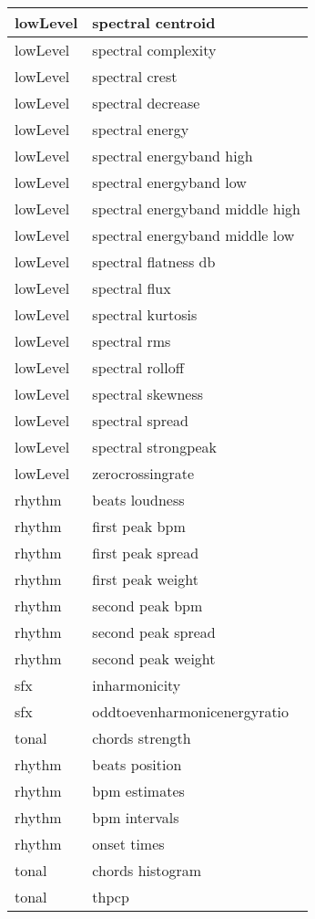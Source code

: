 \begin{center}
\begin{longtable}{| p{} | p{} |}
lowLevel & spectral centroid \\ \hline
lowLevel & spectral complexity \\ \hline
lowLevel & spectral crest \\ \hline
lowLevel & spectral decrease \\ \hline
lowLevel & spectral energy \\ \hline
lowLevel & spectral energyband high \\ \hline
lowLevel & spectral energyband low \\ \hline
lowLevel & spectral energyband middle high \\ \hline
lowLevel & spectral energyband middle low \\ \hline
lowLevel & spectral flatness db \\ \hline
lowLevel & spectral flux \\ \hline
lowLevel & spectral kurtosis \\ \hline
lowLevel & spectral rms \\ \hline
lowLevel & spectral rolloff \\ \hline
lowLevel & spectral skewness \\ \hline
lowLevel & spectral spread \\ \hline
lowLevel & spectral strongpeak \\ \hline
lowLevel & zerocrossingrate \\ \hline
rhythm & beats loudness \\ \hline
rhythm & first peak bpm \\ \hline
rhythm & first peak spread \\ \hline
rhythm & first peak weight \\ \hline
rhythm & second peak bpm \\ \hline
rhythm & second peak spread \\ \hline
rhythm & second peak weight \\ \hline
sfx & inharmonicity \\ \hline
sfx & oddtoevenharmonicenergyratio \\ \hline
tonal & chords strength \\ \hline
rhythm & beats position \\ \hline
rhythm & bpm estimates \\ \hline
rhythm & bpm intervals \\ \hline
rhythm & onset times \\ \hline
tonal & chords histogram \\ \hline
tonal & thpcp \\ \hline

\end{longtable}
\end{center}
